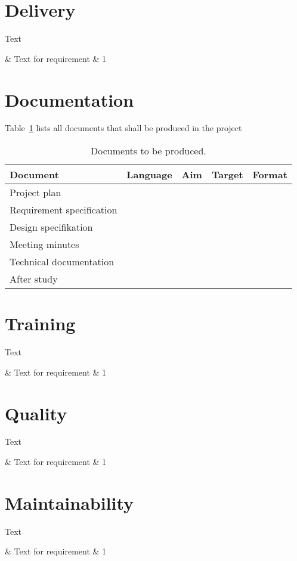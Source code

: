 \documentclass[10pt,oneside,english]{lips}
\begin{document}
\section{Delivery} 
Text
\begin{requirements}
  \requirementno & Text for requirement & 1\\
\end{requirements}

\section{Documentation} 
Table~\ref{tab:doks} lists all documents that shall be produced in the
project
\begin{table}[htbp]
  \centering
  \caption{Documents to be produced.}
  \label{tab:doks}
  \begin{tabular}{|l|l|l|l|l|}
    \hline
    Document & Language & Aim & Target & Format\\
    \hline
    Project plan &&&&\\
    Requirement specification &&&&\\
    Design specifikation &&&&\\
    Meeting minutes &&&&\\
    Technical documentation &&&&\\
    After study &&&&\\
    \hline
  \end{tabular}  
\end{table}

\section{Training}
Text
\begin{requirements}
  \requirementno & Text for requirement & 1\\
\end{requirements}

\section{Quality}
Text
\begin{requirements}
  \requirementno & Text for requirement & 1\\
\end{requirements}

\section{Maintainability}
Text
\begin{requirements}
  \requirementno & Text for requirement & 1\\
\end{requirements}
\end{document}
